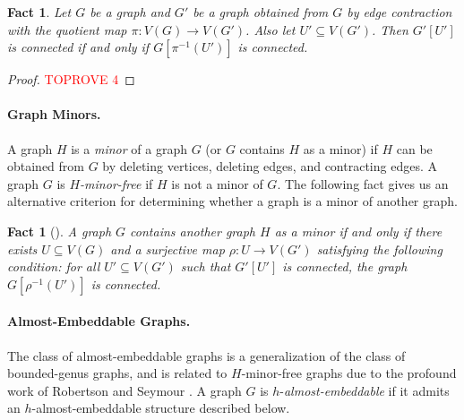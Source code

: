 \documentclass[a4paper,11pt]{article}
\numberwithin{lemma}{section}
\newtheorem{fact}[lemma]{Fact}
\begin{document}
\begin{fact}\label{fact-quotient}
 Let $G$ be a graph and $G'$ be a graph obtained from $G$ by edge contraction with the quotient map $\pi\colon V(G) \rightarrow V(G')$.
 Also let $U' \subseteq V(G')$.
 Then $G'[U']$ is connected if and only if $G[\pi^{-1}(U')]$ is connected.
\end{fact}

\begin{proof}\textcolor{red}{TOPROVE 4}\end{proof}

\paragraph{Graph Minors.}
A graph $H$ is a \emph{minor} of a graph $G$ (or $G$ contains $H$ as a minor) if $H$ can be obtained from $G$ by deleting vertices, deleting edges, and contracting edges.
A graph $G$ is \emph{$H$-minor-free} if $H$ is not a minor of $G$.
The following fact gives us an alternative criterion for determining whether a graph is a minor of another graph.

\begin{fact}[\cite{CyganFKLMPPS15}]\label{fact-minormap}
 A graph $G$ contains another graph $H$ as a minor if and only if there exists $U \subseteq V(G)$ and a surjective map $\rho\colon U \to V(G')$ satisfying the following condition: for all $U' \subseteq V(G')$ such that $G'[U']$ is connected, the graph $G[\rho^{-1}(U')]$ is connected.
\end{fact}

\paragraph{Almost-Embeddable Graphs.}
The class of almost-embeddable graphs is a generalization of the class of bounded-genus graphs, and is related to $H$-minor-free graphs due to the profound work of Robertson and Seymour \cite{RobertsonS03a}.
A graph $G$ is $h$-\emph{almost-embeddable} if it admits an $h$-almost-embeddable structure described below.
\end{document}
